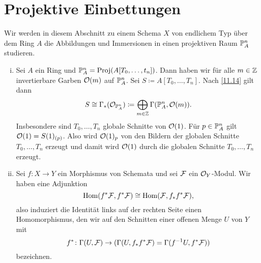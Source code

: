 
\chapter{Projektive Einbettungen}

\begin{bem}
\label{bem:15.1}
	Wir werden in diesem Abschnitt zu einem Schema $X$ von endlichem Typ über dem Ring $A$ die Abbildungen und Immersionen in einen projektiven Raum $\P^n_A$ studieren.
\end{bem}

\begin{bem}
\label{bem:15.2}
	\begin{enumerate}[i)]
		\item Sei $A$ ein Ring und $\P^n_A=\Proj(A[T_0,\ldots,t_n])$. Dann haben wir für alle $m \in \Z$ invertierbare Garben $\mco(m)$ auf $\P^n_A$. Sei $S \coloneqq A[T_0,\ldots,T_n]$. Nach \ref{11.14} gilt dann
		\[
			S \cong \Gamma_*(\mco_{\P_A^n})\coloneqq \bigoplus_{m \in \Z} \Gamma(\P^n_A,\mco(m)).
		\]
		Insbesondere sind $T_0,\ldots,T_n$ globale Schnitte von $\mco(1)$. Für $p \in \P^n_A$ gilt $\mco(1) = S(1)_{(p)}$. Also wird $\mco(1)_p$ von den Bildern der globalen Schnitte $T_0,\ldots,T_n$ erzeugt und damit wird $\mco(1)$ durch die globalen Schnitte $T_0,\ldots,T_n$ erzeugt.
		\item Sei $f\colon X \to Y$ ein Morphismus von Schemata und sei $\mcf$ ein $\mco_Y$-Modul. Wir haben eine Adjunktion
		\[
			\Hom(f^*\mcf,f^*\mcf) \cong \Hom(\mcf,f_*f^*\mcf),
		\]
		also induziert die Identität links auf der rechten Seite einen Homomorphismus, den wir auf den Schnitten einer offenen Menge $U$ von $Y$ mit
		\[
			f^*\colon \Gamma(U,\mcf) \to (\Gamma(U,f_*f^*\mcf) = \Gamma(f^{-1}U,f^*\mcf))
		\]
		bezeichnen.
	\end{enumerate}
\end{bem}

